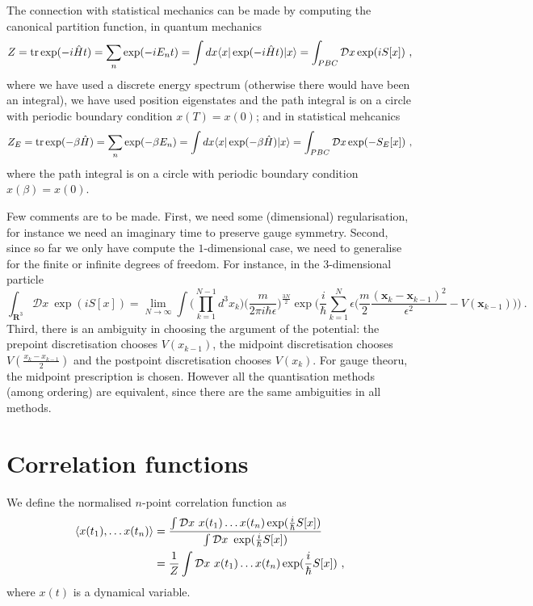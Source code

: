     The connection with statistical mechanics can be made by computing the canonical partition function, in quantum mechanics 
    \begin{equation*}
        Z = \operatorname{tr} \exp(- i \hat H t) = \sum_n \exp(-i E_n t) = \int dx \langle x\vert \exp(- i \hat H t) \vert x\rangle = \int_{PBC} \mathcal D x \exp (i S [x]) ~,
    \end{equation*}
    where we have used a discrete energy spectrum (otherwise there would have been an integral), we have used position eigenstates and the path integral is on a circle with periodic boundary condition $x(T) = x(0)$; and in statistical mehcanics 
    \begin{equation*}
        Z_E = \operatorname{tr} \exp(- \beta \hat H) = \sum_n \exp (-\beta E_n) = \int dx \langle x\vert \exp(- \beta \hat H) \vert x\rangle = \int_{PBC} \mathcal D x \exp (- S_E [x]) ~,
    \end{equation*}
    where the path integral is on a circle with periodic boundary condition $x(\beta) = x(0)$.

    Few comments are to be made. First, we need some (dimensional) regularisation, for instance we need an imaginary time to preserve gauge symmetry. Second, since so far we only have compute the $1$-dimensional case, we need to generalise for the finite or infinite degrees of freedom. For instance, in the $3$-dimensional particle
    \begin{equation*}
        \int_{\mathbf R^3} \mathcal D x ~ \exp (i S[x]) = \lim_{N \rightarrow \infty} \int \Big (\prod_{k=1}^{N-1} d^3 x_k \Big ) \Big (\frac{m}{2\pi i \hbar \epsilon} \Big)^{\frac{3N}{2}} \exp \Big (\frac{i}{\hbar} \sum_{k=1}^{N} \epsilon \Big (\frac{m}{2} \frac{(\mathbf x_k - \mathbf x_{k-1})^2}{\epsilon^2} - V (\mathbf x_{k-1}) \Big )  \Big )  ~.
    \end{equation*}
    Third, there is an ambiguity in choosing the argument of the potential: the prepoint discretisation chooses $V(x_{k-1})$, the midpoint discretisation chooses $V(\frac{x_k - x_{k-1}}{2})$ and the postpoint discretisation chooses $V(x_{k})$. For gauge theoru, the midpoint prescription is chosen. However all the quantisation methods (among ordering) are equivalent, since there are the same ambiguities in all methods. 

\chapter{Correlation functions}

    We define the normalised $n$-point correlation function as 
    \begin{equation*}
    \begin{aligned}
        \langle x(t_1), \ldots x(t_n)\rangle & = \frac{\int \mathcal D x ~ x(t_1) \ldots x(t_n) \exp(\frac{i}{\hbar} S[x])}{\int \mathcal D x ~ \exp(\frac{i}{\hbar} S[x])} \\ & = \frac{1}{Z} \int \mathcal D x ~ x(t_1) \ldots x(t_n) \exp(\frac{i}{\hbar} S[x])~,
    \end{aligned}
    \end{equation*}
    where $x(t)$ is a dynamical variable. 

